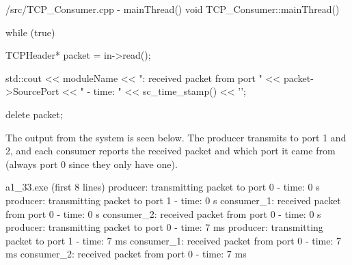 \documentclass[../main.tex]{subfiles}
\begin{document}
\begin{myminted}{/src/TCP\_Consumer.cpp - mainThread()}
void TCP_Consumer::mainThread() {
    while (true) {
        TCPHeader* packet = in->read();

        std::cout << moduleName << ": received packet from port " 
        << packet->SourcePort << " - time: " 
        << sc_time_stamp() << '\n';

        delete packet;
    }
}
\end{myminted}

The output from the system is seen below. The producer transmits to port 1 and 2, and each consumer reports the received packet and which port it came from (always port 0 since they only have one).

\begin{mintedterminal}{a1\_33.exe (first 8 lines)}
producer: transmitting packet to port 0 - time: 0 s
producer: transmitting packet to port 1 - time: 0 s
consumer_1: received packet from port 0 - time: 0 s
consumer_2: received packet from port 0 - time: 0 s
producer: transmitting packet to port 0 - time: 7 ms
producer: transmitting packet to port 1 - time: 7 ms
consumer_1: received packet from port 0 - time: 7 ms
consumer_2: received packet from port 0 - time: 7 ms
\end{mintedterminal}
\end{document}
